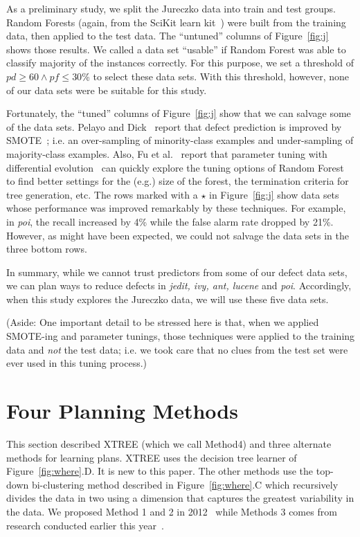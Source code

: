 \documentclass{sig-alternate}
\newcommand{\fig}[1]{Figure~\ref{fig:#1}}
\begin{document}
As a preliminary study, we split the Jureczko  data into train and test groups.
Random Forests (again, from the SciKit learn kit~\cite{Pedregosa2012}) were
built from the training data, then applied to the test data.
The ``untuned'' columns of \fig{j} shows those results. We called a data set ``usable'' if Random Forest was able to classify majority of the instances correctly. For this purpose, we set a threshold of $\mathit{pd}\ge 60 \wedge \mathit{pf} \le 30$\% to select these data sets. With this threshold, however, none of our data sets were be suitable for this study.

Fortunately, the ``tuned'' columns of \fig{j} show that we can salvage some of the data sets. Pelayo and Dick~\cite{pelayo07} report that defect prediction is improved by SMOTE~\cite{Chawla2002}; i.e. an over-sampling of minority-class examples and under-sampling of majority-class examples. Also, Fu et al.~\cite{fu:ase15} report that parameter tuning with differential evolution~\cite{storn97} can quickly explore the tuning options of Random Forest to find better settings for the (e.g.) size of the forest, the termination criteria
for tree generation, etc. The rows \colorbox{celadon}{marked with a $\star$} in \fig{j} show data sets whose performance was improved remarkably by these techniques. For example, in {\em poi}, the recall increased by 4\% while the false alarm rate dropped by 21\%. However,  as might have been expected, we could not salvage the data sets in the  three bottom rows.

In summary, while we cannot trust predictors from some of our defect data sets,
we can plan ways to reduce defects in {\em jedit, ivy, ant, lucene} and {\em poi}.
Accordingly, when this study explores the Jureczko data, we will use these five data sets.

(Aside: One important detail to be stressed here is that, when we applied    SMOTE-ing and
parameter tunings, those techniques were applied to the training data and {\em not}
the test data; i.e. we took care that no clues from the test set were ever used in this tuning process.)



 
\section{Four Planning Methods}\label{sect:planners}
 
This section described XTREE (which we call Method4) and  three  
alternate methods for learning plans.
  XTREE  uses the decision tree learner of \fig{where}.D.  It is new to this paper.
  The other methods use the   top-down
	bi-clustering method described in \fig{where}.C  which recursively divides the
	data in two  using a dimension that captures the greatest variability in the data. 
	We proposed Method 1 and 2   in 2012~\cite{me12c} while Methods 3 comes from research conducted earlier this year~\cite{krishna15}.
 
\end{document}
